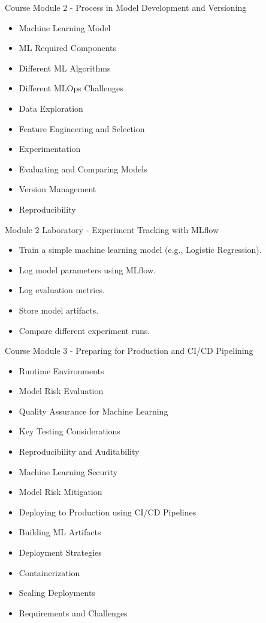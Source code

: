 \documentclass[aspectratio=169]{beamer}
\begin{document}
\begin{frame}{Course Module 2 - Process in Model Development and Versioning}
\begin{itemize}

\item Machine Learning Model
\item ML Required Components
\item Different ML Algorithms
\item Different MLOps Challenges
\item Data Exploration
\item Feature Engineering and Selection
\item Experimentation
\item Evaluating and Comparing Models
\item Version Management
\item Reproducibility

\end{itemize}
\end{frame}

\begin{frame}{Module 2 Laboratory - Experiment Tracking with MLflow}

\begin{itemize}

\item Train a simple machine learning model (e.g., Logistic Regression).
\item Log model parameters using MLflow.
\item Log evaluation metrics.
\item Store model artifacts.
\item Compare different experiment runs.

\end{itemize}

\end{frame}

\begin{frame}{Course Module 3 - Preparing for Production and CI/CD Pipelining}
\begin{itemize}

\item Runtime Environments
\item Model Risk Evaluation
\item Quality Assurance for Machine Learning
\item Key Testing Considerations
\item Reproducibility and Auditability
\item Machine Learning Security
\item Model Risk Mitigation
\item Deploying to Production using CI/CD Pipelines
\item Building ML Artifacts
\item Deployment Strategies
\item Containerization
\item Scaling Deployments
\item Requirements and Challenges

\end{itemize}
\end{frame}
\end{document}
